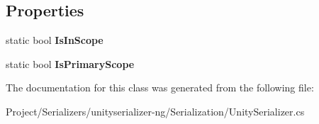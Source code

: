\subsection*{Properties}
\begin{DoxyCompactItemize}
\item 
\mbox{\label{class_serialization_1_1_unity_serializer_1_1_serialization_scope_acd527aba526e1163ea14ff5a948ea01d}} 
static bool {\bfseries Is\+In\+Scope}
\item 
\mbox{\label{class_serialization_1_1_unity_serializer_1_1_serialization_scope_a31c0f0a357ffc96fe09e9df649ae0168}} 
static bool {\bfseries Is\+Primary\+Scope}
\end{DoxyCompactItemize}


The documentation for this class was generated from the following file\+:\begin{DoxyCompactItemize}
\item 
Project/\+Serializers/unityserializer-\/ng/\+Serialization/Unity\+Serializer.\+cs\end{DoxyCompactItemize}
